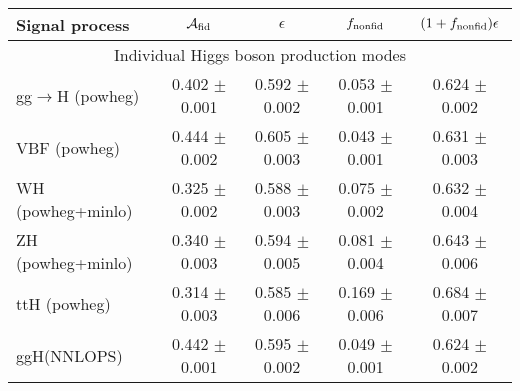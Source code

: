 \documentclass{article}
\begin{document}
\begin{table}[!h!tb]
\begin{center}
\small
\begin{tabular}{|l|c|c|c|c|} \hline \hline 
\textbf{Signal process} & $\mathcal{A}_{\rm fid}$ & $\epsilon$ & $f_{\rm nonfid}$  & $(1+f_{\rm nonfid})\epsilon$ \\ \hline \hline 
\multicolumn{5}{|c|}{Individual Higgs boson production modes} \\ \hline 
gg$\rightarrow$H ({\sc powheg})  & 0.402 $\pm$ 0.001 & 0.592 $\pm$ 0.002 & 0.053 $\pm$ 0.001 & 0.624 $\pm$ 0.002 \\ 
 VBF ({\sc powheg})  & 0.444 $\pm$ 0.002 & 0.605 $\pm$ 0.003 & 0.043 $\pm$ 0.001 & 0.631 $\pm$ 0.003 \\ 
 WH ({\sc powheg+minlo}) & 0.325 $\pm$ 0.002 & 0.588 $\pm$ 0.003 & 0.075 $\pm$ 0.002 & 0.632 $\pm$ 0.004 \\ 
 ZH ({\sc powheg+minlo})  & 0.340 $\pm$ 0.003 & 0.594 $\pm$ 0.005 & 0.081 $\pm$ 0.004 & 0.643 $\pm$ 0.006 \\ 
 ttH ({\sc powheg}) & 0.314 $\pm$ 0.003 & 0.585 $\pm$ 0.006 & 0.169 $\pm$ 0.006 & 0.684 $\pm$ 0.007 \\ 
 ggH(NNLOPS) & 0.442 $\pm$ 0.001 & 0.595 $\pm$ 0.002 & 0.049 $\pm$ 0.001 & 0.624 $\pm$ 0.002 \\ 
 
\hline \hline
\end{tabular}
\normalsize
\end{center}
\end{table}
\end{document}
